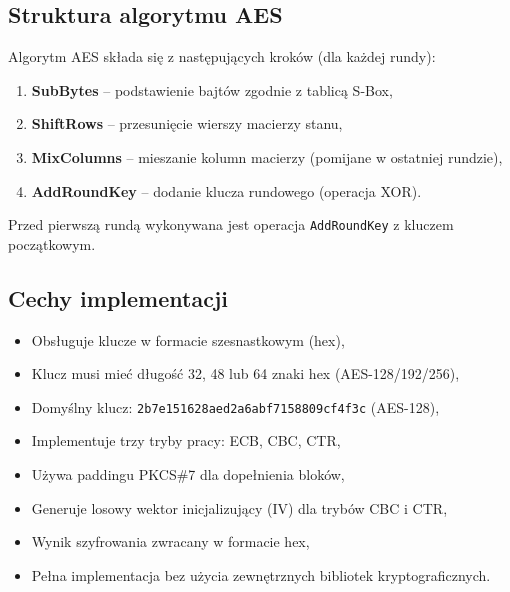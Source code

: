 \documentclass[12pt,a4paper]{article}
\begin{document}
\subsection{Struktura algorytmu AES}
Algorytm AES składa się z następujących kroków (dla każdej rundy):
\begin{enumerate}
    \item \textbf{SubBytes} -- podstawienie bajtów zgodnie z tablicą S-Box,
    \item \textbf{ShiftRows} -- przesunięcie wierszy macierzy stanu,
    \item \textbf{MixColumns} -- mieszanie kolumn macierzy (pomijane w ostatniej rundzie),
    \item \textbf{AddRoundKey} -- dodanie klucza rundowego (operacja XOR).
\end{enumerate}

Przed pierwszą rundą wykonywana jest operacja \texttt{AddRoundKey} z kluczem początkowym.

\subsection{Cechy implementacji}
\begin{itemize}
    \item Obsługuje klucze w formacie szesnastkowym (hex),
    \item Klucz musi mieć długość 32, 48 lub 64 znaki hex (AES-128/192/256),
    \item Domyślny klucz: \texttt{2b7e151628aed2a6abf7158809cf4f3c} (AES-128),
    \item Implementuje trzy tryby pracy: ECB, CBC, CTR,
    \item Używa paddingu PKCS\#7 dla dopełnienia bloków,
    \item Generuje losowy wektor inicjalizujący (IV) dla trybów CBC i CTR,
    \item Wynik szyfrowania zwracany w formacie hex,
    \item Pełna implementacja bez użycia zewnętrznych bibliotek kryptograficznych.
\end{itemize}
\end{document}
